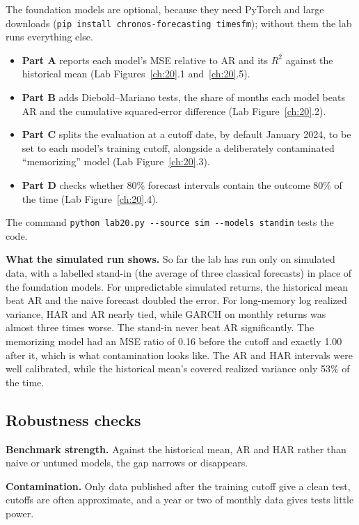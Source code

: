 The foundation models are optional, because they need PyTorch and large downloads (\texttt{pip install chronos-forecasting timesfm}); without them the lab runs everything else.

\begin{itemize}
  \item \textbf{Part A} reports each model's MSE relative to AR and its $R^2$ against the historical mean (Lab Figures~\ref{ch:20}.1 and~\ref{ch:20}.5).
  \item \textbf{Part B} adds Diebold--Mariano tests, the share of months each model beats AR and the cumulative squared-error difference (Lab Figure~\ref{ch:20}.2).
  \item \textbf{Part C} splits the evaluation at a cutoff date, by default January 2024, to be set to each model's training cutoff, alongside a deliberately contaminated ``memorizing'' model (Lab Figure~\ref{ch:20}.3).
  \item \textbf{Part D} checks whether 80\% forecast intervals contain the outcome 80\% of the time (Lab Figure~\ref{ch:20}.4).
\end{itemize}

The command \texttt{python lab20.py -{}-source sim -{}-models standin} tests the code.

\textbf{What the simulated run shows.} So far the lab has run only on simulated data, with a labelled stand-in (the average of three classical forecasts) in place of the foundation models. For unpredictable simulated returns, the historical mean beat AR and the naive forecast doubled the error. For long-memory log realized variance, HAR and AR nearly tied, while GARCH on monthly returns was almost three times worse. The stand-in never beat AR significantly. The memorizing model had an MSE ratio of 0.16 before the cutoff and exactly 1.00 after it, which is what contamination looks like. The AR and HAR intervals were well calibrated, while the historical mean's covered realized variance only 53\% of the time.

\subsection{Robustness checks}
\label{sec:21-stress}

\textbf{Benchmark strength.} Against the historical mean, AR and HAR rather than naive or untuned models, the gap narrows or disappears.

\textbf{Contamination.} Only data published after the training cutoff give a clean test, cutoffs are often approximate, and a year or two of monthly data gives tests little power.

